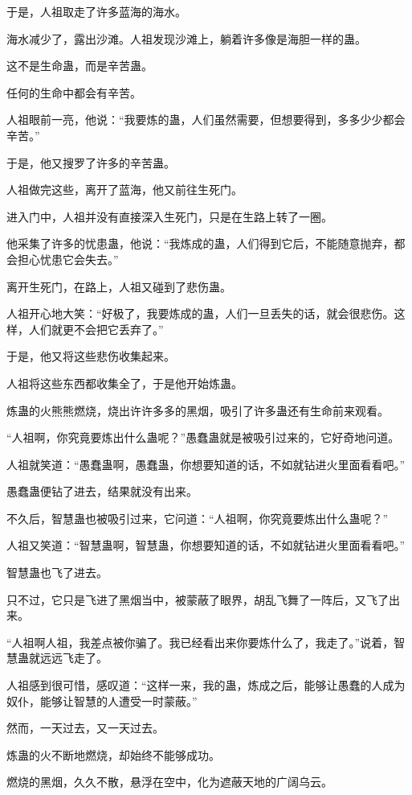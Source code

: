 \begin{this_body}
于是，人祖取走了许多蓝海的海水。

海水减少了，露出沙滩。人祖发现沙滩上，躺着许多像是海胆一样的蛊。

这不是生命蛊，而是辛苦蛊。

任何的生命中都会有辛苦。

人祖眼前一亮，他说：“我要炼的蛊，人们虽然需要，但想要得到，多多少少都会辛苦。”

于是，他又搜罗了许多的辛苦蛊。

人祖做完这些，离开了蓝海，他又前往生死门。

进入门中，人祖并没有直接深入生死门，只是在生路上转了一圈。

他采集了许多的忧患蛊，他说：“我炼成的蛊，人们得到它后，不能随意抛弃，都会担心忧患它会失去。”

离开生死门，在路上，人祖又碰到了悲伤蛊。

人祖开心地大笑：“好极了，我要炼成的蛊，人们一旦丢失的话，就会很悲伤。这样，人们就更不会把它丢弃了。”

于是，他又将这些悲伤收集起来。

人祖将这些东西都收集全了，于是他开始炼蛊。

炼蛊的火熊熊燃烧，烧出许许多多的黑烟，吸引了许多蛊还有生命前来观看。

“人祖啊，你究竟要炼出什么蛊呢？”愚蠢蛊就是被吸引过来的，它好奇地问道。

人祖就笑道：“愚蠢蛊啊，愚蠢蛊，你想要知道的话，不如就钻进火里面看看吧。”

愚蠢蛊便钻了进去，结果就没有出来。

不久后，智慧蛊也被吸引过来，它问道：“人祖啊，你究竟要炼出什么蛊呢？”

人祖又笑道：“智慧蛊啊，智慧蛊，你想要知道的话，不如就钻进火里面看看吧。”

智慧蛊也飞了进去。

只不过，它只是飞进了黑烟当中，被蒙蔽了眼界，胡乱飞舞了一阵后，又飞了出来。

“人祖啊人祖，我差点被你骗了。我已经看出来你要炼什么了，我走了。”说着，智慧蛊就远远飞走了。

人祖感到很可惜，感叹道：“这样一来，我的蛊，炼成之后，能够让愚蠢的人成为奴仆，能够让智慧的人遭受一时蒙蔽。”

然而，一天过去，又一天过去。

炼蛊的火不断地燃烧，却始终不能够成功。

燃烧的黑烟，久久不散，悬浮在空中，化为遮蔽天地的广阔乌云。


\end{this_body}
